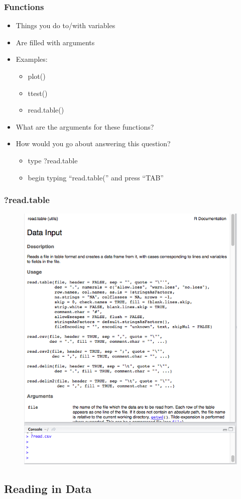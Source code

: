 \documentclass[14pt]{beamer}
\begin{document}
\begin{frame}
\frametitle{Functions}
\begin{itemize}
	\item<+-> Things you do to/with variables
	\item<+-> Are filled with arguments
	\item<+-> Examples:
	\begin{itemize}
		\item<+-> plot()
		\item<+-> ttest()
		\item<+-> read.table()
	\end{itemize}
	\item<+-> What are the arguments for these functions?
	\item<+-> How would you go about answering this question?
	\begin{itemize}
		\item<+-> type ?read.table
		\item<+-> begin typing ``read.table('' and press ``TAB''
	\end{itemize}
\end{itemize}
\end{frame}

\begin{frame}
\frametitle{?read.table}
\begin{figure}
\includegraphics[width=0.52\linewidth]{images_20170907_readcsv.png}
\end{figure}
\end{frame}

\subsection{Reading in Data}
\end{document}
